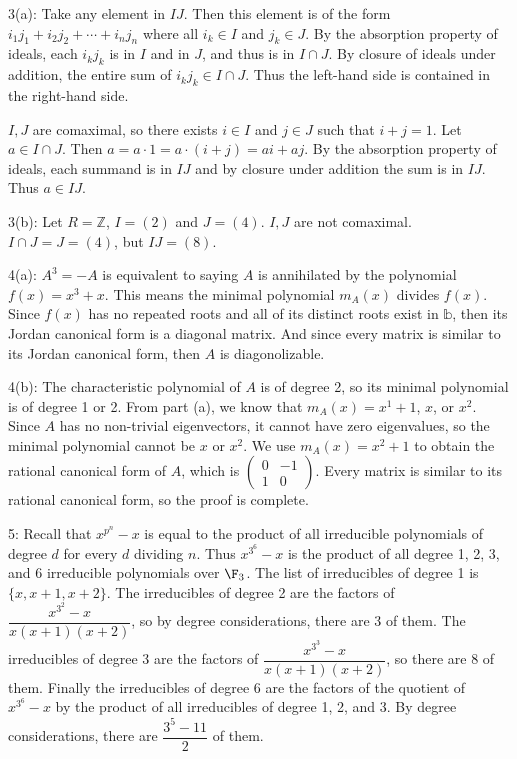 \documentclass[12pt]{article}
\newcommand{\Z}{\mathbb{Z}}
\begin{document}
3(a): Take any element in $IJ$. Then this element is of the form $i_1j_1 + i_2j_2 + \cdots + i_n j_n$ where all $i_k \in I$ and $j_k \in J$. By the absorption property of ideals, each $i_k j_k$ is in $I$ and in $J$, and thus is in $I \cap J$. By closure of ideals under addition, the entire sum of $i_k j_k \in I \cap J$. Thus the left-hand side is contained in the right-hand side. \newline

$I,J$ are comaximal, so there exists $i \in I$ and $j \in J$ such that $i+j = 1$. Let $a \in I \cap J$. Then $a = a \cdot 1 = a \cdot (i+j) = ai + aj$. By the absorption property of ideals, each summand is in $IJ$ and by closure under addition the sum is in $IJ$. Thus $a \in IJ$. \newline

3(b): Let $R = \Z$, $I = (2)$ and $J = (4)$. $I,J$ are not comaximal. $I \cap J = J = (4)$, but $IJ = (8).$ \newline

4(a): $A^3 = -A$ is equivalent to saying $A$ is annihilated by the polynomial $f(x) = x^3 + x$. This means the minimal polynomial $m_A(x)$ divides $f(x)$. Since $f(x)$ has no repeated roots and all of its distinct roots exist in $\mathbb{b}$, then its Jordan canonical form is a diagonal matrix. And since every matrix is similar to its Jordan canonical form, then $A$ is diagonolizable. \newline

4(b): The characteristic polynomial of $A$ is of degree 2, so its minimal polynomial is of degree 1 or 2. From part (a), we know that $m_A(x) = x^1 + 1$, $x$, or $x^2$. Since $A$ has no non-trivial eigenvectors, it cannot have zero eigenvalues, so the minimal polynomial cannot be $x$ or $x^2$. We use $m_A(x) = x^2 + 1$ to obtain the rational canonical form of $A$, which is $\left ( \begin{array}{cc} 0 & -1 \\ 1 & 0 \end{array} \right )$. Every matrix is similar to its rational canonical form, so the proof is complete. \newline

5: Recall that $x^{p^n} - x$ is equal to the product of all irreducible polynomials of degree $d$ for every $d$ dividing $n$. Thus $x^{3^6} - x$ is the product of all degree 1, 2, 3, and 6 irreducible polynomials over $\F_3$. The list of irreducibles of degree 1 is $\{x, x+1, x+2\}$. The irreducibles of degree 2 are the factors of $\dfrac{x^{3^2}-x}{x(x+1)(x+2)}$, so by degree considerations, there are 3 of them. The irreducibles of degree 3 are the factors of $\dfrac{x^{3^3} - x}{x(x+1)(x+2)}$, so there are 8 of them. Finally the irreducibles of degree 6 are the factors of the quotient of $x^{3^6} - x$ by the product of all irreducibles of degree 1, 2, and 3. By degree considerations, there are $\dfrac{3^5 - 11}{2}$ of them. \newline
\end{document}
